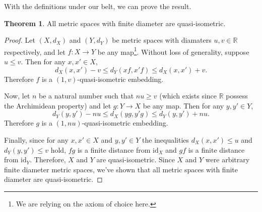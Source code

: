 \documentclass[12pt]{article}
\theoremstyle{definition}
\theoremstyle{theorem}
\newtheorem*{theorem}{Theorem}
\theoremstyle{remark}
\begin{document}
With the definitions under our belt, we can prove the result.

\begin{theorem}
  All metric spaces with finite diameter are quasi-isometric.
\end{theorem}

\begin{proof}
  Let $(X,d_X)$ and $(Y,d_Y)$ be metric spaces with diamaters $u,v\in\mathbb{R}$ respectively, and let $f:X\to Y$ be any map\footnote{We are relying on the axiom of choice here.}. Without loss of generality, suppose $u\leq v$. Then for any $x,x'\in X$, $$d_X(x,x')-v\leq d_Y(xf,x'f) \leq d_X(x,x')+v.$$ Therefore $f$ is a $(1,v)$-quasi-isometric embedding.
  
  Now, let $n$ be a natural number such that $nu\geq v$ (which exists since $\mathbb{R}$ possess the Archimidean property) and let $g:Y\to X$ be any map. Then for any $y,y'\in Y$, $$d_Y(y,y')-nu\leq d_X(yg,y'g)\leq d_Y(y,y')+nu.$$ Therefore $g$ is a $(1,nu)$-quasi-isometric embedding.
  
  Finally, since for any $x,x'\in X$ and $y,y'\in Y$ the inequalities $d_X(x,x')\leq u$ and $d_Y(y,y')\leq v$ hold, $fg$ is a finite distance from $\textrm{id}_X$ and $gf$ is a finite distance from $\textrm{id}_Y$. Therefore, $X$ and $Y$ are quasi-isometric. Since $X$ and $Y$ were arbitrary finite diameter metric spaces, we've shown that all metric spaces with finite diameter are quasi-isometric.
\end{proof}
\end{document}
